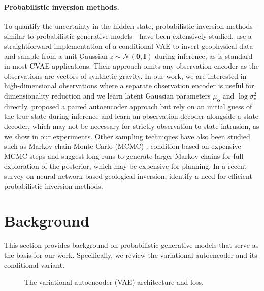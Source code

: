 \paragraph{Probabilistic inversion methods.}
To quantify the uncertainty in the hidden state, probabilistic inversion methods---similar to probabilistic generative models---have been extensively studied.
\textcite{mcaliley2024stochastic} use a straightforward implementation of a conditional VAE to invert geophysical data and sample from a unit Gaussian $z \sim \mathcal{N}(\mathbf{0}, \mathbf{I})$ during inference, as is standard in most CVAE applications.
Their approach omits any observation encoder as the observations are vectors of synthetic gravity.
In our work, we are interested in high-dimensional observations where a separate observation encoder is useful for dimensionality reduction and we learn latent Gaussian parameters $\mu_\mathbf{o}$ and $\log \sigma^2_\mathbf{o}$ directly.
\textcite{chung2024paired} proposed a paired autoencoder approach but rely on an initial guess of the true state during inference and learn an observation decoder alongside a state decoder, which may not be necessary for strictly observation-to-state intrusion, as we show in our experiments.
Other sampling techniques have also been studied such as Markov chain Monte Carlo (MCMC) \cite{metropolis1953equation,hastings1970monte,mosegaard1995monte}.
\textcite{laloy2017inversion} condition based on expensive MCMC steps and suggest long runs to generate larger Markov chains for full exploration of the posterior, which may be expensive for planning.
In a recent survey on neural network-based geological inversion, \textcite{li2023comprehensive} identify a need for efficient probabilistic inversion methods.


\section{Background}\label{sec:vae_background}
This section provides background on probabilistic generative models that serve as the basis for our work.
Specifically, we review the variational autoencoder and its conditional variant.

\begin{figure}[t]
    \centering
    \caption{The variational autoencoder (VAE) architecture and loss.}
    \label{fig:vae}
\end{figure}


